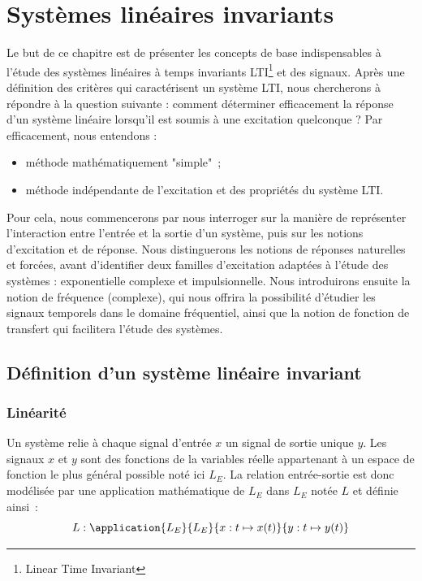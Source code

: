 \chapter{Systèmes linéaires invariants}
\label{chap:lti}
Le but de ce chapitre est de présenter les concepts de base
indispensables à l'étude des systèmes linéaires à temps invariants
LTI\footnote{ Linear Time Invariant} et des signaux.  Après une
définition des critères qui caractérisent un système LTI, nous
chercherons à répondre à la question suivante : comment déterminer
efficacement la réponse d'un système linéaire lorsqu'il est soumis à
une excitation quelconque ?  Par efficacement, nous entendons :
\begin{itemize}
\item méthode mathématiquement "simple"~;
\item méthode indépendante de l'excitation et des propriétés du
  système LTI.
\end{itemize}


Pour cela, nous commencerons par nous interroger sur la manière de
représenter l'interaction entre l'entrée et la sortie d'un système,
puis sur les notions d'excitation et de réponse. Nous distinguerons
les notions de réponses naturelles et forcées, avant d'identifier deux
familles d'excitation adaptées à l'étude des systèmes : exponentielle
complexe et impulsionnelle. Nous introduirons ensuite la notion de
fréquence (complexe), qui nous offrira la possibilité d'étudier les
signaux temporels dans le domaine fréquentiel, ainsi que la notion de
fonction de transfert qui facilitera l'étude des systèmes.
	
	
\section{Définition d'un système linéaire invariant}

\subsection{Linéarité} 
Un système relie à chaque signal d'entrée $x$ un signal de
sortie unique $y$. Les signaux $x$ et $y$ sont des fonctions
de la variables réelle appartenant à un espace de fonction le
plus général possible noté ici $L_E$. La relation
entrée-sortie est donc modélisée par une application
mathématique de $L_E$ dans $L_E$ notée $L$ et définie ainsi~:
\begin{equation}
  L : \application{L_E}{L_E}{x : t\mapsto x(t)}{y : t\mapsto y(t)} 
\end{equation}

